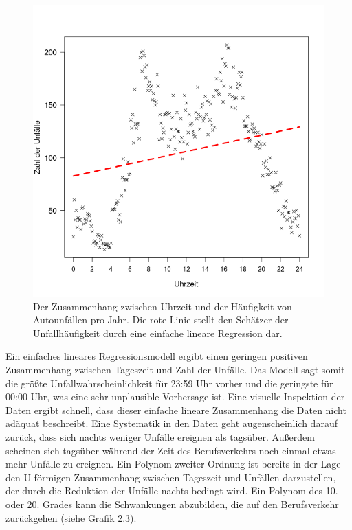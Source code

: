 \begin{figure}[!ht]
  \caption{Der Zusammenhang zwischen Uhrzeit und der Häufigkeit von Autounfällen pro
    Jahr.  Die rote Linie stellt den Schätzer der Unfallhäufigkeit durch eine
    einfache lineare Regression dar. }  \centering
  \includegraphics[width=1\textwidth]{chapters/svm/poly_1.png}
\end{figure}


Ein einfaches lineares Regressionsmodell ergibt einen geringen positiven Zusammenhang
zwischen Tageszeit und Zahl der Unfälle. Das Modell sagt somit die größte
Unfallwahrscheinlichkeit für 23:59 Uhr vorher und die geringste für 00:00 Uhr, was
eine sehr unplausible Vorhersage ist. Eine visuelle Inspektion der Daten ergibt
schnell, dass dieser einfache lineare Zusammenhang die Daten nicht adäquat
beschreibt. Eine Systematik in den Daten geht augenscheinlich darauf zurück, dass
sich nachts weniger Unfälle ereignen als tagsüber. Außerdem scheinen sich tagsüber
während der Zeit des Berufsverkehrs noch einmal etwas mehr Unfälle zu ereignen. Ein
Polynom zweiter Ordnung ist bereits in der Lage den U-förmigen Zusammenhang zwischen
Tageszeit und Unfällen darzustellen, der durch die Reduktion der Unfälle nachts
bedingt wird. Ein Polynom des 10. oder 20. Grades kann die Schwankungen abzubilden,
die auf den Berufsverkehr zurückgehen (siehe Grafik 2.3).

